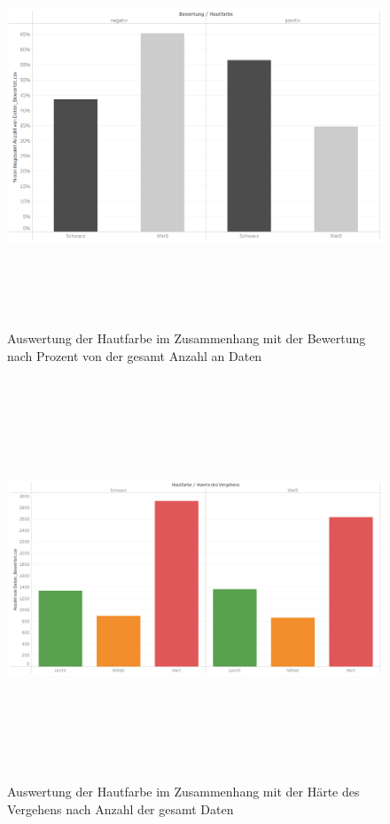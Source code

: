 \documentclass[a4paper,12pt]{report}
\begin{document}
\begin{figure}[!h]
    \centering
    \includegraphics[width=16cm,height=12cm]{Diagramme/SZ1_Tab4.PNG}
    \caption{Auswertung der Hautfarbe im Zusammenhang mit der Bewertung nach Prozent von der gesamt Anzahl an Daten}
    \label{fig:SZ1Tab4}
\end{figure}

\begin{figure}[!h]
    \centering
    \includegraphics[width=16cm,height=12cm]{Diagramme/SZ1_Tab5.PNG}
    \caption{Auswertung der Hautfarbe im Zusammenhang mit der Härte des Vergehens nach Anzahl der gesamt Daten}
    \label{fig:SZ1Tab5}
\end{figure}
\end{document}
